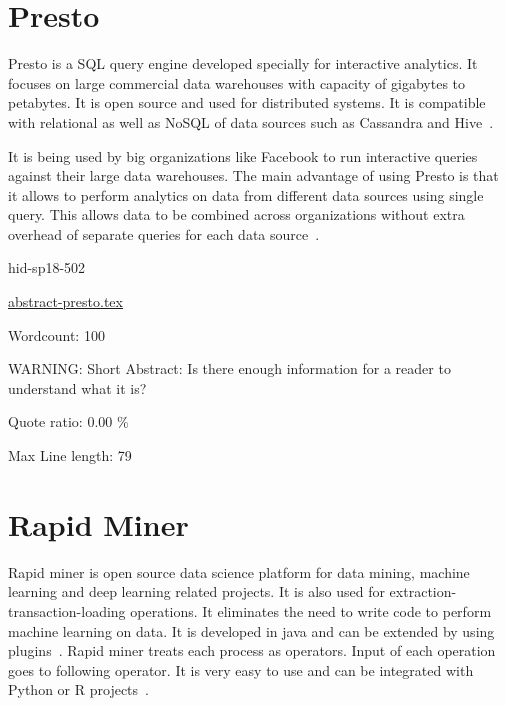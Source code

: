 \section{Presto}

Presto is a SQL query engine developed specially for interactive analytics. It
focuses on large commercial data warehouses with capacity of gigabytes to
petabytes. It is open source and used for distributed systems. It is compatible
with relational as well as NoSQL of data sources such as Cassandra and 
Hive~\cite{hid-sp18-502-Presto}.

It is being used by big organizations like Facebook to run interactive queries
against their large data warehouses. The main advantage of using Presto is that
it allows to perform analytics on data from different data sources using single
query. This allows data to be combined across organizations without extra
overhead of separate queries for each data source~\cite{hid-sp18-502-Presto}.



\begin{IU}

hid-sp18-502

\href{https://github.com/cloudmesh-community/hid-sp18-502/blob/master//technology/abstract-presto.tex}{abstract-presto.tex}

 

Wordcount: 100

WARNING: Short Abstract: Is there enough information for a reader to understand what it is?


Quote ratio: 0.00 \%
 
Max Line length: 79
\end{IU}

\section{Rapid Miner}

Rapid miner is open source data science platform for data mining, machine
learning and deep learning related projects. It is also used for
extraction-transaction-loading operations. It eliminates the need to write code
to perform machine learning on data. It is developed in java and can be extended
 by using plugins~\cite{hid-sp18-502-RapidMiner}.
Rapid miner treats each process as operators. Input of each operation goes to
following operator. It is very easy to use and can be integrated with Python or
R projects~\cite{hid-sp18-502-RapidMiner}.





